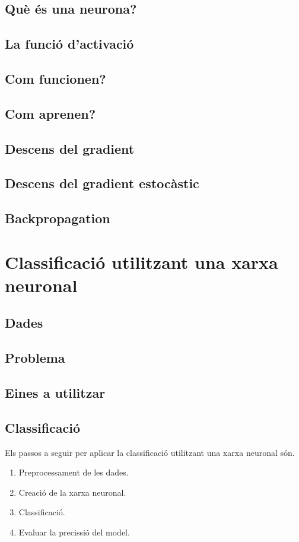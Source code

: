 \documentclass[12pt]{article}
\begin{document}
\subsection{Què és una neurona?}
\subsection{La funció d'activació}
\subsection{Com funcionen?}
\subsection{Com aprenen?}
\subsection{Descens del gradient}
\subsection{Descens del gradient estocàstic}
\subsection{Backpropagation}

\clearpage
\section{Classificació utilitzant una xarxa neuronal}
\subsection{Dades}
\subsection{Problema}
\subsection{Eines a utilitzar}
\subsection{Classificació}
Els passos a seguir per aplicar la classificació utilitzant una xarxa neuronal són.
\begin{enumerate}
	\item Preprocessament de les dades.
	\item Creació de la xarxa neuronal.
	\item Classificació.
	\item Evaluar la precissió del model.
\end{enumerate}
\end{document}
